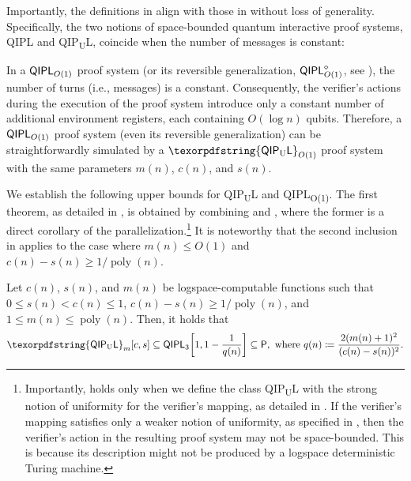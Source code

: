 \documentclass[10pt,a4paper]{article}
\numberwithin{equation}{section}
\numberwithin{figure}{section}
\newcommand{\Ptime}{\textnormal{\textsf{P}}\xspace}
\newcommand{\QIPL}{\textnormal{\textsf{QIPL}}\xspace}
\newcommand{\QIPLconst}{\texorpdfstring{\textnormal{\textsf{QIPL}\textsubscript{O(1)}}}\xspace}
\newcommand{\QIPUL}{\texorpdfstring{\textnormal{\textsf{QIP}\textsubscript{\textnormal{U}}\textsf{L}}}\xspace}
\DeclarePairedDelimiter\sbra{\lbrack}{\rbrack}
\DeclareMathOperator\poly{poly}
\begin{document}
Importantly, the definitions in  align with those in  without loss of generality. Specifically, the two notions of space-bounded quantum interactive proof systems, \QIPL{} and \QIPUL{}, coincide when the number of messages is constant:
\begin{remark}[The equivalence of $\QIPL_{O(1)}$ and $\QIPUL_{O(1)}$]
    \label{remark:QIPLconst-welldefined}
    In a $\QIPL_{O(1)}$ proof system (or its reversible generalization, $\QIPL^{\diamond}_{O(1)}$, see ), the number of turns (i.e., messages) is a constant. Consequently, the verifier's actions during the execution of the proof system introduce only a constant number of additional environment registers, each containing $O(\log{n})$ qubits. Therefore, a $\QIPL_{O(1)}$ proof system (even its reversible generalization) can be straightforwardly simulated by a $\QIPUL_{O(1)}$ proof system with the same parameters $m(n)$, $c(n)$, and $s(n)$. 
\end{remark}

\vspace{1em}
We establish the following upper bounds for \QIPUL{} and \QIPLconst{}. 
The first theorem, as detailed in , is obtained by combining  and , where the former is a direct corollary of the parallelization.\footnote{Importantly,  holds only when we define the class \QIPUL{} with the strong notion of uniformity for the verifier's mapping, as detailed in . If the verifier's mapping satisfies only a weaker notion of uniformity, as specified in , then the verifier's action in the resulting proof system may not be space-bounded. This is because its description might not be produced by a logspace deterministic Turing machine.\label{footref:QIPL-uniformity-in-parallelization}} It is noteworthy that the second inclusion in  applies to the case where $m(n) \leq O(1)$ and $c(n) - s(n) \geq 1/\poly(n)$. 

\begin{theorem}[$\QIPUL \subseteq \Ptime$]
    \label{thm:QIPUL-in-P}
    Let $c(n)$, $s(n)$, and $m(n)$ be logspace-computable functions such that $0 \leq s(n) < c(n) \leq 1$, $c(n) \!-\! s(n) \geq 1/\poly(n)$, and $1 \leq m(n) \leq \poly(n)$. Then, it holds that
    \[ \QIPUL_m[c,s] \subseteq \QIPL_3\sbra*{1,1-\frac{1}{q(n)}} \subseteq \Ptime, \text{ where } q(n) \coloneqq \frac{2(m(n)+1)^2}{(c(n) - s(n))^2}. \]
\end{theorem}
\end{document}
